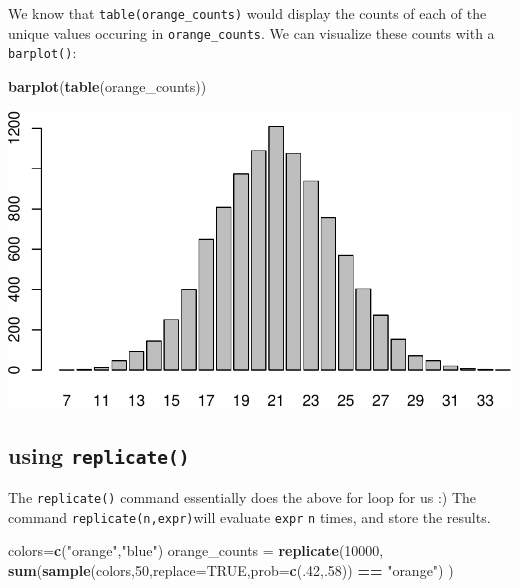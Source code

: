 \documentclass[
]{book}
\newenvironment{Shaded}{\begin{snugshade}}{\end{snugshade}}
\newcommand{\AttributeTok}[1]{\textcolor[rgb]{0.13,0.29,0.53}{#1}}
\newcommand{\ConstantTok}[1]{\textcolor[rgb]{0.56,0.35,0.01}{#1}}
\newcommand{\DecValTok}[1]{\textcolor[rgb]{0.00,0.00,0.81}{#1}}
\newcommand{\FunctionTok}[1]{\textcolor[rgb]{0.13,0.29,0.53}{\textbf{#1}}}
\newcommand{\NormalTok}[1]{#1}
\newcommand{\OtherTok}[1]{\textcolor[rgb]{0.56,0.35,0.01}{#1}}
\newcommand{\SpecialCharTok}[1]{\textcolor[rgb]{0.81,0.36,0.00}{\textbf{#1}}}
\newcommand{\StringTok}[1]{\textcolor[rgb]{0.31,0.60,0.02}{#1}}
\theoremstyle{definition}
\theoremstyle{definition}
\theoremstyle{definition}
\theoremstyle{definition}
\theoremstyle{remark}
\begin{document}
We know that \texttt{table(orange\_counts)} would display the counts of each of the unique values occuring in \texttt{orange\_counts}. We can visualize these counts with a \texttt{barplot()}:

\begin{Shaded}
\begin{Highlighting}[]
\FunctionTok{barplot}\NormalTok{(}\FunctionTok{table}\NormalTok{(orange\_counts))}
\end{Highlighting}
\end{Shaded}

\includegraphics{math340-notes_files/figure-latex/unnamed-chunk-88-1.pdf}

\subsection*{\texorpdfstring{using \texttt{replicate()}}{using replicate()}}\label{using-replicate}

The \texttt{replicate()} command essentially does the above for loop for us :) The command \texttt{replicate(n,expr)}will evaluate \texttt{expr} \texttt{n} times, and store the results.

\begin{Shaded}
\begin{Highlighting}[]
\NormalTok{colors}\OtherTok{=}\FunctionTok{c}\NormalTok{(}\StringTok{"orange"}\NormalTok{,}\StringTok{"blue"}\NormalTok{)}
\NormalTok{orange\_counts }\OtherTok{=} 
  \FunctionTok{replicate}\NormalTok{(}\DecValTok{10000}\NormalTok{,}
            \FunctionTok{sum}\NormalTok{(}\FunctionTok{sample}\NormalTok{(colors,}\DecValTok{50}\NormalTok{,}\AttributeTok{replace=}\ConstantTok{TRUE}\NormalTok{,}\AttributeTok{prob=}\FunctionTok{c}\NormalTok{(.}\DecValTok{42}\NormalTok{,.}\DecValTok{58}\NormalTok{)) }\SpecialCharTok{==} \StringTok{"orange"}\NormalTok{)}
\NormalTok{            )}
\end{Highlighting}
\end{Shaded}
\end{document}
